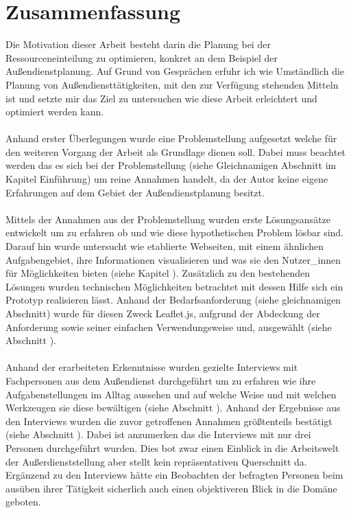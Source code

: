 \documentclass[Bachelorarbeit.tex]{subfiles}
\begin{document}
\section{Zusammenfassung}
Die Motivation dieser Arbeit besteht darin die Planung bei der Ressourceneinteilung zu optimieren, konkret an dem Beispiel der Außendienstplanung. 
Auf Grund von Gesprächen erfuhr ich wie Umständlich die Planung von Außendiensttätigkeiten, mit den zur Verfügung stehenden Mitteln ist und setzte mir das Ziel zu untersuchen wie diese Arbeit erleichtert und optimiert werden kann.\\
\\
Anhand erster Überlegungen wurde eine Problemstellung aufgesetzt welche für den weiteren Vorgang der Arbeit als Grundlage dienen soll.
Dabei muss beachtet werden das es sich bei der Problemstellung (siehe Gleichnamigen Abschnitt im Kapitel Einführung) um reine Annahmen handelt, da der Autor keine eigene Erfahrungen auf dem Gebiet der Außendienstplanung besitzt.\\
\\
Mittels der Annahmen aus der Problemstellung wurden erste Lösungsansätze entwickelt um zu erfahren ob und wie diese hypothetischen Problem lösbar sind.
Darauf hin wurde untersucht wie etablierte Webseiten, mit einem ähnlichen Aufgabengebiet, ihre Informationen visualisieren und was sie den Nutzer\_innen für Möglichkeiten bieten (siehe Kapitel ). 
Zusätzlich zu den bestehenden Lösungen wurden technischen Möglichkeiten betrachtet mit dessen Hilfe sich ein Prototyp realisieren lässt.
Anhand der Bedarfsanforderung (siehe gleichnamigen Abschnitt) wurde für diesen Zweck Leaflet.js, aufgrund der Abdeckung der Anforderung sowie seiner einfachen Verwendungsweise und, ausgewählt (siehe Abschnitt ).\\
\\
Anhand der erarbeiteten Erkenntnisse wurden gezielte Interviews mit Fachpersonen aus dem Außendienst durchgeführt um zu erfahren wie ihre Aufgabenstellungen im Alltag aussehen und auf welche Weise und mit welchen Werkzeugen sie diese bewältigen (siehe Abschnitt ). 
Anhand der Ergebnisse aus den Interviews wurden die zuvor getroffenen Annahmen größtenteils bestätigt (siehe Abschnitt ).
Dabei ist anzumerken das die Interviews mit nur drei Personen durchgeführt wurden. 
Dies bot zwar einen Einblick in die Arbeitswelt der Außerdienststellung aber stellt kein repräsentativen Querschnitt da.
Ergänzend zu den Interviews hätte ein Beobachten der befragten Personen beim ausüben ihrer Tätigkeit sicherlich auch einen objektiveren Blick in die Domäne geboten.\\
\end{document}
